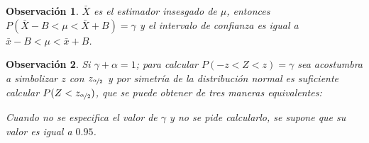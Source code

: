 \documentclass[a5paper,doc,10pt,noapacite]{apa6}
\newtheorem{observ}{Observación}
\begin{document}
{{\begin{observ}\label{obs-4.2}
	\(\bar{X}\) es el estimador insesgado de \(\mu\), entonces \(P(\bar{X}-B<\mu<\bar{X}+B)=\gamma\) y el intervalo de confianza es igual a \(\bar{x}-B<\mu<\bar{x}+B\).
\end{observ}
	
\begin{observ}
	Si \(\gamma+\alpha=1\); para calcular \(P(-z<Z<z)=\gamma\) sea acostumbra a simbolizar \(z\) con \(z_{\nicefrac{\alpha}{2}}\) y por simetría  de la distribución normal es suficiente calcular \(P(Z<z_{\nicefrac{\alpha}{2}})\), que  se puede obtener de tres maneras equivalentes:

	\begin{figure}[H]
\hspace{-3.5em}
\begin{floatrow}
	\fontsize{8}{11}\selectfont
	\captionsetup{justification=centering, labelfont=footnotesize, font=footnotesize}
\end{floatrow}
\end{figure}
	
	\vspace{-3\baselineskip}
	Cuando no se especifica el valor de \(\gamma\) y no se pide calcularlo, se supone que su valor es igual a \(0.95\).
\end{observ}


}}
\end{document}
